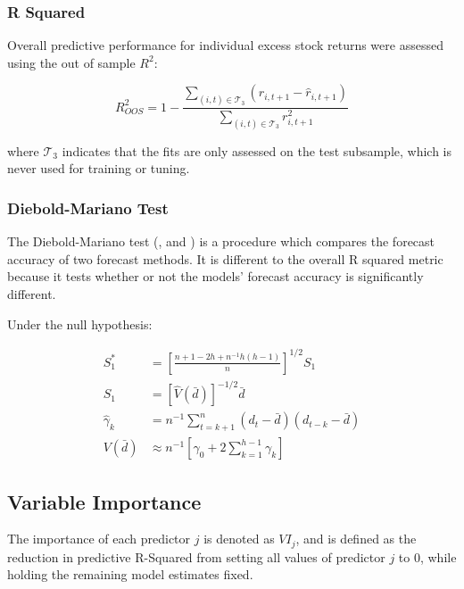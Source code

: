 \documentclass[a4paper]{article}
\newcommand{\smalltodo}[2][] {\todo[caption={#2}, size=\scriptsize,%
	fancyline,#1]{\begin{spacing}{.5}#2\end{spacing}}}
\newcommand{\rhs}[2][]{\smalltodo[color=green!30,#1]{{\bf RS:} #2}}
\begin{document}
\subsubsection{R Squared}

Overall predictive performance for individual excess stock returns were assessed using the out of sample $R^2$:

\begin{equation}
	R^2_{OOS} = 1 - \frac{\sum_{(i, t)\in\mathcal{T}_3}(r_{i, t+1} - \widehat{r}_{i, t+1})}{\sum_{(i, t)\in\mathcal{T}_3}r_{i, t+1}^2}
\end{equation}

where $\mathcal{T}_3$ indicates that the fits are only assessed on the test subsample, which is never used for training or tuning. 

\subsubsection{Diebold-Mariano Test}

The Diebold-Mariano test (\cite{diebold_comparing_2002}, and \cite{harvey_testing_1997}) is a procedure which compares the forecast accuracy of two forecast methods. It is different to the overall R squared metric because it tests whether or not the models' forecast accuracy is significantly different. 

Under the null hypothesis:

\begin{align}
	S_1^* &= \left[ 
		\frac{n + 1 - 2h + n^{-1}h(h-1)}
			{n}
	\right]^{1/2}S_1 \\
	S_1 &= \left[ 
		\hat{V}(\bar{d})
	\right] ^{-1/2}\bar{d} \\
	\hat{\gamma}_k &= n^{-1} \sum_{t = k + 1}^{n}(d_t - \bar{d})(d_{t-k} - \bar{d}) \\
	V(\bar{d}) &\approx n^{-1}\left[ 
		\gamma_0 + 2 \sum_{k = 1}^{h - 1}\gamma_k
	\right] 
\end{align}

\subsection{Variable Importance}

\rhs{Pending}

The importance of each predictor $j$ is denoted as $VI_j$, and is defined as the reduction in predictive R-Squared from setting all values of predictor $j$ to 0, while holding the remaining model estimates fixed. 
\end{document}
